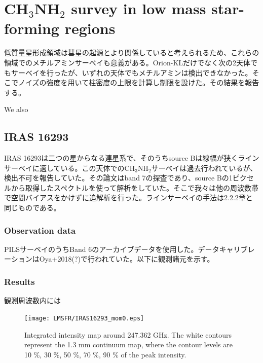 \chapter{CH$_{3}$NH$_{2}$ survey in low mass star-forming regions
\label{chap:appendixA}}

低質量星形成領域は彗星の起源とより関係していると考えられるため、これらの領域でのメチルアミンサーベイも意義がある。Orion-KLだけでなく次の2天体でもサーベイを行ったが、いずれの天体でもメチルアミンは検出できなかった。そこでノイズの強度を用いて柱密度の上限を計算し制限を設けた。その結果を報告する。

We also 

\section{IRAS 16293}
IRAS 16293は二つの星からなる連星系で、そのうちsource Bは線幅が狭くラインサーベイに適している。この天体でのCH$_{3}$NH$_{2}$サーベイは過去行われているが、検出不可を報告していた。その論文はband 7の探査であり、source Bの1ピクセルから取得したスペクトルを使って解析をしていた。そこで我々は他の周波数帯で空間バイアスをかけずに追解析を行った。ラインサーベイの手法は2.2.2章と同じものである。

\subsection{Observation data}
PILSサーベイのうちBand 6のアーカイブデータを使用した。データキャリブレーションはOya+2018(?)で行われていた。以下に観測諸元を示す。


\subsection{Results}
観測周波数内には


\begin{figure}[H]
  \centering
  \texttt{[image: LMSFR/IRAS16293\_mom0.eps]}
  \caption{Integrated intensity map around 247.362 GHz. The white contours represent the 1.3 mm continuum map, where the contour levels are 10 \%, 30 \%, 50 \%, 70 \%, 90 \% of the peak intensity.}
  \label{IRAS16293_mom0}
\end{figure}


